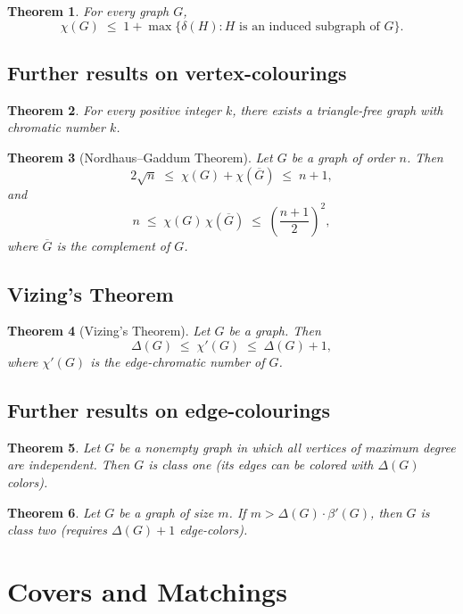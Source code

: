 \documentclass{article}
\newtheorem{theorem}{Theorem}[section]
\begin{document}
\begin{theorem}
For every graph $G$, 
$$
\chi(G)\;\le\; 1 + \max\{\delta(H) : H\text{ is an induced subgraph of }G\}.
$$
\end{theorem}

\subsection{Further results on vertex-colourings}
\begin{theorem}
For every positive integer $k$, there exists a triangle-free graph with chromatic number $k$.
\end{theorem}

\begin{theorem}[Nordhaus--Gaddum Theorem]
Let $G$ be a graph of order $n$. Then
$$
2\sqrt{n} \;\le\; \chi(G)+\chi(\overline{G}) \;\le\; n+1,
$$
and
$$
n \;\le\; \chi(G)\,\chi(\overline{G}) \;\le\; \left(\frac{n+1}{2}\right)^2,
$$
where $\overline{G}$ is the complement of $G$.
\end{theorem}

\subsection{Vizing's Theorem}
\begin{theorem}[Vizing's Theorem]
Let $G$ be a graph. Then
$$
\Delta(G)\;\le\;\chi'(G)\;\le\;\Delta(G)+1,
$$
where $\chi'(G)$ is the edge-chromatic number of $G$.
\end{theorem}

\subsection{Further results on edge-colourings}
\begin{theorem}
Let $G$ be a nonempty graph in which all vertices of maximum degree are independent. Then $G$ is class one (its edges can be colored with $\Delta(G)$ colors).
\end{theorem}

\begin{theorem}
Let $G$ be a graph of size $m$. If $m > \Delta(G)\cdot \beta'(G)$, then $G$ is class two (requires $\Delta(G)+1$ edge-colors).
\end{theorem}

\section{Covers and Matchings}
\end{document}
